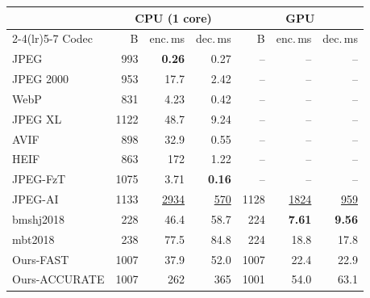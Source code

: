 \begin{tabular}{lrrrrrr}
\toprule
& \multicolumn{3}{c}{CPU (1 core)} & \multicolumn{3}{c}{GPU} \\
\cmidrule(lr){2-4}\cmidrule(lr){5-7}
Codec & B & enc.\,ms & dec.\,ms & B & enc.\,ms & dec.\,ms \\
\midrule
JPEG & 993 & \cellcolor{green!25}\textbf{0.26} & 0.27 & -- & -- & -- \\
JPEG 2000 & 953 & 17.7 & 2.42 & -- & -- & -- \\
WebP & 831 & 4.23 & 0.42 & -- & -- & -- \\
JPEG XL & 1122 & 48.7 & 9.24 & -- & -- & -- \\
AVIF & 898 & 32.9 & 0.55 & -- & -- & -- \\
HEIF & 863 & 172 & 1.22 & -- & -- & -- \\
JPEG-FzT & 1075 & 3.71 & \cellcolor{green!25}\textbf{0.16} & -- & -- & -- \\
JPEG-AI & 1133 & \cellcolor{red!22}\underline{2934} & \cellcolor{red!22}\underline{570} & 1128 & \cellcolor{red!22}\underline{1824} & \cellcolor{red!22}\underline{959} \\
bmshj2018 & 228 & 46.4 & 58.7 & 224 & \cellcolor{green!25}\textbf{7.61} & \cellcolor{green!25}\textbf{9.56} \\
mbt2018 & 238 & 77.5 & 84.8 & 224 & 18.8 & 17.8 \\
Ours-FAST & 1007 & 37.9 & 52.0 & 1007 & 22.4 & 22.9 \\
Ours-ACCURATE & 1007 & 262 & 365 & 1001 & 54.0 & 63.1 \\
\bottomrule
\end{tabular}
